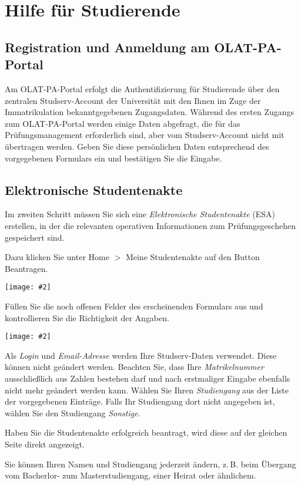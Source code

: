 \documentclass[a4paper,11pt]{article}
\newcommand{\bild}[2]{
    \begin{center}\texttt{[image: \#2]}\end{center}
}
\newcommand{\knopf}[1]{{\sc #1}}
\begin{document}
\clearpage
\section{Hilfe für Studierende}

\subsection{Registration und Anmeldung am OLAT-PA-Portal}

Am OLAT-PA-Portal erfolgt die Authentifizierung für Studierende über den
zentralen Studserv-Account der Universität mit den Ihnen im Zuge der
Immatrikulation bekanntgegebenen Zugangsdaten.  Während des ersten Zugangs zum
OLAT-PA-Portal werden einige Daten abgefragt, die für das Prüfungsmanagement
erforderlich sind, aber vom Studserv-Account nicht mit übertragen werden.
Geben Sie diese persönlichen Daten entsprechend des vorgegebenen Formulars ein
und bestätigen Sie die Eingabe.

\subsection{Elektronische Studentenakte}

Im zweiten Schritt müssen Sie sich eine {\em Elektronische Studentenakte} (ESA)
erstellen, in der die relevanten operativen Informationen zum
Prüfungsgeschehen gespeichert sind. 

Dazu klicken Sie unter \knopf{Home $>$ Meine Studentenakte} auf den Button
\knopf{Beantragen}.

\bild{.95}{ESA-Beantragen}

Füllen Sie die noch offenen Felder des erscheinenden Formulars aus und
kontrollieren Sie die Richtigkeit der Angaben.

\bild{.7}{ESA-Eingaben}

Als {\em Login} und {\em Email-Adresse} werden Ihre Studserv-Daten verwendet.
Diese können nicht geändert werden. Beachten Sie, dass Ihre {\em Matrikelnummer}
ausschließlich aus Zahlen bestehen darf und nach erstmaliger Eingabe ebenfalls
nicht mehr geändert werden kann. Wählen Sie Ihren {\em Studiengang}
aus der Liste der vorgegebenen Einträge.  Falls Ihr Studiengang dort nicht
angegeben ist, wählen Sie den Studiengang {\em Sonstige}.

Haben Sie die Studentenakte erfolgreich beantragt, wird diese auf der gleichen
Seite direkt angezeigt.

Sie können Ihren Namen und Studiengang jederzeit ändern, z.\,B. beim
Übergang vom Bacherlor- zum Masterstudiengang, einer Heirat oder ähnlichem.
\end{document}
